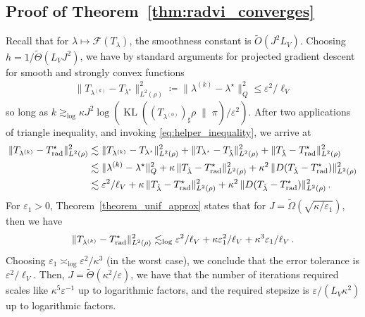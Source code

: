\documentclass[twoside]{article}
\newcommand{\cF}{\mathcal{F}}
\newcommand{\1}{\mathds{1}}
\newcommand{\kl}[2]{\KL(#1 \!\;\|\; \!#2)}
\newcommand{\eps}{\varepsilon}
\renewcommand{\epsilon}{\varepsilon}
\newcommand*{\defeq}{\coloneqq}
\DeclareMathOperator*{\KL}{KL}
\theoremstyle{plain}
\theoremstyle{definition}
\theoremstyle{remark}
\renewcommand{\tilde}{\widetilde}
\begin{document}
\subsection{Proof of Theorem~\ref{thm:radvi_converges}}\label{app:radvi_converges_proof}
Recall that for $\lambda \mapsto \cF(T_\lambda)$, the smoothness constant is $\widetilde O(J^2 L_V)$. Choosing $h = 1/\widetilde\Theta(L_V J^2)$, we have by standard arguments for projected gradient descent for smooth and strongly convex functions \citep[Theorem 10.29]{Beck2017} 
\begin{align*}
    \|T_{\lambda^{(k)}} - T_{\lambda^\star}\|^2_{L^2(\rho)} \defeq \|\lambda^{(k)} - \lambda^{\star}\|^2_Q \leq \epsilon^2/\ell_V
\end{align*}
so long as $k \gtrsim_{\log} \kappa J^2 \log({\kl{(T_{\lambda^{(0)}})_\sharp \rho}{\pi}}/\epsilon^2)$. {After two applications of triangle inequality, and invoking \eqref{eq:helper_inequality}, we arrive at
\begin{align*}
    \|T_{\lambda^{(k)}} - T^\star_{\rm rad}\|^2_{L^2(\rho)} &\lesssim \|T_{\lambda^{(k)}} - T_{\lambda^{\star}}\|^2_{L^2(\rho)} + \|T_{\lambda^{\star}} - T_{\hat \lambda}\|^2_{L^2(\rho)} + \|T_{\hat\lambda} - T^\star_{\rm rad}\|^2_{L^2(\rho)}\\
    &\lesssim\|\lambda^{(k)} - \lambda^{\star}\|^2_Q + \kappa\, \|T_{\hat \lambda} - T_{\rm rad}^\star\|^2_{L^2(\rho)} + \kappa^2\, \|D(T_{\hat \lambda} - T_{\rm rad}^\star)\|^2_{L^2(\rho)} \\
    &\lesssim \eps^2/\ell_V +  \kappa\, \|T_{\hat \lambda} - T_{\rm rad}^\star\|^2_{L^2(\rho)} + \kappa^2\, \|D(T_{\hat \lambda} - T_{\rm rad}^\star)\|^2_{L^2(\rho)}\,.
\end{align*}
For $\eps_1 > 0$, Theorem~\ref{theorem_unif_approx} states that for $J = \tilde{\Omega}(\sqrt{\kappa/\eps_1})$, then we have
\begin{align*}
    \|T_{\lambda^{(k)}} - T^\star_{\rm rad}\|^2_{L^2(\rho)} \lesssim_{\rm log} \eps^2/\ell_V + \kappa \eps_1^2/\ell_V + \kappa^3 \eps_1/\ell_V\,.
\end{align*}
Choosing $\eps_1 \asymp_{\log} \eps^2/\kappa^3$ (in the worst case), we conclude that the error tolerance is $\eps^2/\ell_V$. Then, $J = \tilde{\Theta}(\kappa^2/\eps)$, we have that the number of iterations required scales like $\kappa^5\eps^{-1}$ up to logarithmic factors, and the required stepsize is $\eps/(L_V\kappa^2)$ up to logarithmic factors.}
\end{document}

